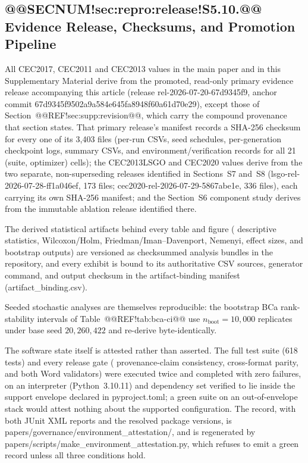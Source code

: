 \documentclass[10pt,a4paper]{article}
\begin{document}
\subsection{@@SECNUM!sec:repro:release!S5.10.@@ Evidence Release, Checksums, and Promotion Pipeline}\label{sec:repro:release}

All CEC2017, CEC2011 and CEC2013 values in the main paper and in this
Supplementary Material derive from the promoted, read-only primary
evidence release accompanying this article (release
rel-2026-07-20-67d9345f9, anchor commit
67d9345f9502a9a584e645fa8948f60a61d70e29), except those of
Section~@@REF!sec:supp:revision@@, which carry the compound provenance that
section states.  That primary release's manifest
records a SHA-256 checksum for every one of its 3{,}403 files (per-run
CSVs, seed schedules, per-generation checkpoint logs, summary CSVs, and
environment/verification records for all 21 (suite, optimizer) cells);
the CEC2013LSGO and CEC2020 values derive from the two separate,
non-superseding releases identified in Sections~S7 and~S8
(lsgo-rel-2026-07-28-ff1a046ef, 173 files;
cec2020-rel-2026-07-29-5867abe1e, 336 files), each carrying its own
SHA-256 manifest; and the Section~S6 component study derives from the
immutable ablation release identified there.

The derived statistical artifacts behind every table and figure (
descriptive statistics, Wilcoxon/Holm, Friedman/Iman--Davenport,
Nemenyi, effect sizes, and bootstrap outputs) are versioned as
checksummed analysis bundles in the repository, and every exhibit is
bound to its authoritative CSV
sources, generator command, and output checksum in
the artifact-binding manifest (artifact\_binding.csv).

Seeded stochastic analyses are themselves reproducible: the bootstrap
BCa rank-stability intervals of Table~@@REF!tab:bca-ci@@ use
$n_{\text{boot}} = 10{,}000$ replicates under
base seed $20{,}260{,}422$ and re-derive byte-identically.


The software state itself is attested rather than asserted.  The full test
suite (618 tests) and every release gate (
provenance-claim consistency, cross-format parity, and both Word validators)
were executed twice and completed with zero failures, on an interpreter
(Python~3.10.11) and dependency set verified to lie inside the support
envelope declared in pyproject.toml; a green suite on an
out-of-envelope stack would attest nothing about the supported configuration.
The record, with both JUnit XML reports and the resolved package versions, is
papers/governance/environment\_attestation/, and is regenerated by
papers/scripts/make\_environment\_attestation.py, which refuses to
emit a green record unless all three conditions hold.
\end{document}
